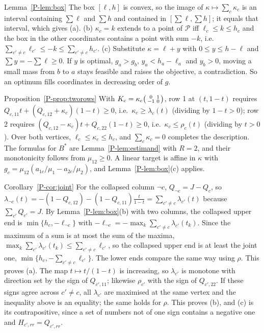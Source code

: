 \begin{proofof}{Lemma~\ref{P-lem:box}}
The box $[\ell,h]$ is convex, so the image of $\kappa\mapsto\sum_c\kappa_c$ is an
interval containing $\sum\ell$ and $\sum h$ and contained in $[\sum\ell,\sum h]$; it
equals that interval, which gives (a). (b) $\kappa_c=k$ extends to a point of
$\mathcal P$ iff $\ell_c\le k\le h_c$ and the box in the other coordinates contains a
point with sum $-k$, i.e.\ $\sum_{c'\ne c}\ell_{c'}\le-k\le\sum_{c'\ne c}h_{c'}$.
(c) Substitute $\kappa=\ell+y$ with $0\le y\le h-\ell$ and $\sum y=-\sum\ell\ge0$. If
$y$ is optimal, $g_a>g_b$, $y_a<h_a-\ell_a$ and $y_b>0$, moving a small mass from $b$
to $a$ stays feasible and raises the objective, a contradiction. So an optimum fills
coordinates in decreasing order of $g$.
\end{proofof}

\begin{proofof}{Proposition~\ref{P-prop:tworows}}
With $K_c=\kappa_c\begin{psmallmatrix}0&1\\-1&0\end{psmallmatrix}$, row 1 at
$(t,1-t)$ requires $Q_{c,11}t+(Q_{c,12}+\kappa_c)(1-t)\ge0$, i.e.\
$\kappa_c\ge\lambda_c(t)$ (dividing by $1-t>0$); row 2 requires
$(Q_{c,12}-\kappa_c)t+Q_{c,22}(1-t)\ge0$, i.e.\ $\kappa_c\le\rho_c(t)$ (dividing by
$t>0$). Over both vertices, $\ell_c\le\kappa_c\le h_c$, and $\sum_c\kappa_c=0$ completes
the description. The formulas for $B^*$ are Lemma~\ref{P-lem:estimand} with $R=2$, and
their monotonicity follows from $\mu_{12}\ge0$. A linear target is affine in $\kappa$
with $g_c=\mu_{12}(a_{1c}/\mu_1-a_{2c}/\mu_2)$, and Lemma~\ref{P-lem:box}(c) applies.
\end{proofof}

\begin{proofof}{Corollary~\ref{P-cor:joint}}
For the collapsed column $\neg c$, $Q_{\neg c}=J-Q_c$, so
$\lambda_{\neg c}(t)=-(1-Q_{c,12})-(1-Q_{c,11})\tfrac t{1-t}=\sum_{c'\ne c}\lambda_{c'}(t)$
because $\sum_{c'}Q_{c'}=J$. By Lemma~\ref{P-lem:box}(b) with two columns, the
collapsed upper end is $\min\{h_c,-\ell_{\neg c}\}$ with
$-\ell_{\neg c}=-\max_k\sum_{c'\ne c}\lambda_{c'}(t_k)$. Since the maximum of a sum is
at most the sum of the maxima, $\max_k\sum_{c'}\lambda_{c'}(t_k)\le\sum_{c'\ne c}\ell_{c'}$,
so the collapsed upper end is at least the joint one,
$\min\{h_c,-\sum_{c'\ne c}\ell_{c'}\}$. The lower ends compare the same way using
$\rho$. This proves (a). The map $t\mapsto t/(1-t)$ is increasing, so $\lambda_{c'}$ is
monotone with direction set by the sign of $Q_{c',11}$; likewise $\rho_{c'}$ with the
sign of $Q_{c',22}$. If these signs agree across $c'\ne c$, all $\lambda_{c'}$ are
maximised at the same vertex and the inequality above is an equality; the same holds
for $\rho$. This proves (b), and (c) is its contrapositive, since a set of numbers not
of one sign contains a negative one and $H_{c',rr}=Q_{c',rr}$.
\end{proofof}

